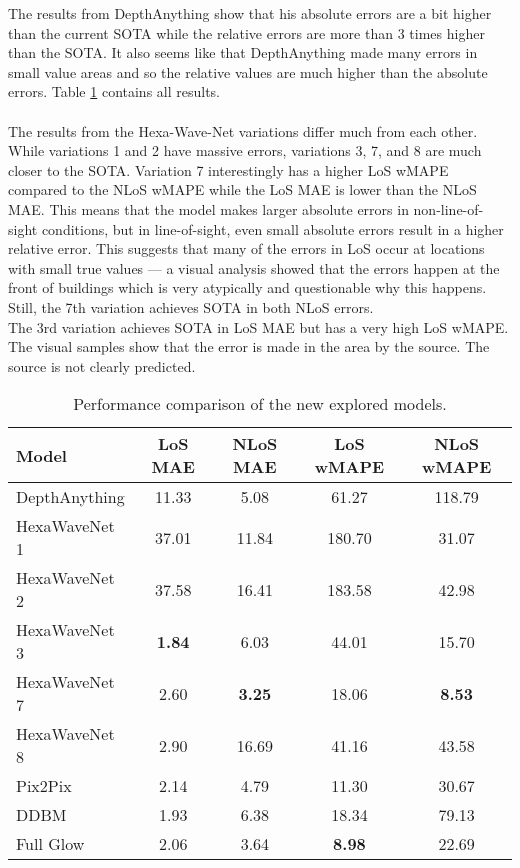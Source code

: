		The results from DepthAnything show that his absolute errors are a bit higher than the current SOTA while the relative errors are more than 3 times higher than the SOTA. It also seems like that DepthAnything made many errors in small value areas and so the relative values are much higher than the absolute errors. Table \ref{tab:experiment_architecture_results} contains all results.\\
		\\
		The results from the Hexa-Wave-Net variations differ much from each other. While variations 1 and 2 have massive errors, variations 3, 7, and 8 are much closer to the SOTA. Variation 7 interestingly has a higher LoS wMAPE compared to the NLoS wMAPE while the LoS MAE is lower than the NLoS MAE. This means that the model makes larger absolute errors in non-line-of-sight conditions, but in line-of-sight, even small absolute errors result in a higher relative error. This suggests that many of the errors in LoS occur at locations with small true values — a visual analysis showed that the errors happen at the front of buildings which is very atypically and questionable why this happens. Still, the 7th variation achieves SOTA in both NLoS errors. \\
		The 3rd variation achieves SOTA in LoS MAE but has a very high LoS wMAPE. The visual samples show that the error is made in the area by the source. The source is not clearly predicted.
		
		\begin{table}[h!]
			\centering
			\begin{tabular}{|l|c|c|c|c|}
				\hline
				\textbf{Model} & \textbf{LoS MAE} & \textbf{NLoS MAE} & \textbf{LoS wMAPE} & \textbf{NLoS wMAPE} \\
				\hline
				DepthAnything & 11.33 & 5.08 & 61.27 & 118.79 \\
				HexaWaveNet 1 & 37.01 & 11.84 & 180.70 & 31.07 \\
				HexaWaveNet 2 & 37.58 & 16.41 & 183.58 & 42.98 \\
				HexaWaveNet 3 & \textbf{1.84} & 6.03 & 44.01 & 15.70 \\
				HexaWaveNet 7 & 2.60 & \textbf{3.25} & 18.06 & \textbf{8.53} \\
				HexaWaveNet 8 & 2.90 & 16.69 & 41.16 & 43.58 \\
				Pix2Pix & 2.14 & 4.79 & 11.30 & 30.67 \\
				DDBM & 1.93 & 6.38 & 18.34 & 79.13 \\
				Full Glow & 2.06 & 3.64 & \textbf{8.98} & 22.69 \\
				\hline
			\end{tabular}
			\caption{Performance comparison of the new explored models.}
			\label{tab:experiment_architecture_results}
		\end{table}
		\FloatBarrier
		
